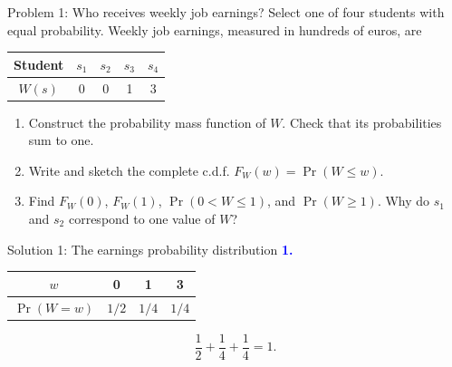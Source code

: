 \documentclass[notes,10pt, aspectratio=169]{beamer}
\newif\ifshowsolutions
\newcommand{\answerpart}[1]{\textcolor{blue}{\textbf{#1.}}\,}
\begin{document}
\begin{frame}{Problem 1: Who receives weekly job earnings?}
Select one of four students with equal probability. Weekly job earnings, measured in hundreds of euros, are
\begin{center}
\begin{tabular}{c|cccc}
Student & $s_1$ & $s_2$ & $s_3$ & $s_4$ \\ \hline
$W(s)$ & 0 & 0 & 1 & 3
\end{tabular}
\end{center}
\begin{enumerate}
\setlength{\itemsep}{6pt}
\item Construct the probability mass function of $W$. Check that its probabilities sum to one.
\item Write and sketch the complete c.d.f. $F_W(w)=\Pr(W\leq w)$.
\item Find $F_W(0)$, $F_W(1)$, $\Pr(0<W\leq1)$, and $\Pr(W\geq1)$. Why do $s_1$ and $s_2$ correspond to one value of $W$?
\end{enumerate}
\end{frame}

\ifshowsolutions
\begin{frame}{Solution 1: The earnings probability distribution}
\small
\answerpart{1}
\begin{center}
\begin{tabular}{c|ccc}
$w$ & 0 & 1 & 3 \\ \hline
$\Pr(W=w)$ & $1/2$ & $1/4$ & $1/4$
\end{tabular}
\end{center}
\[
\frac12+\frac14+\frac14=1.
\]
\end{frame}
\end{document}
